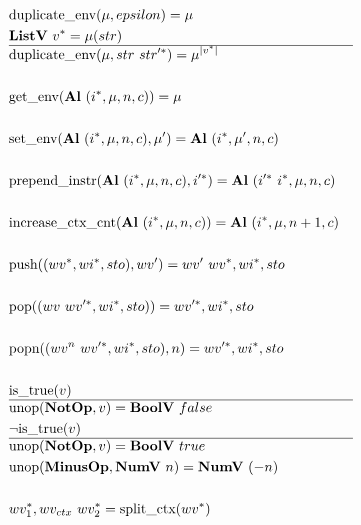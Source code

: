 \begin{align*}
%
\newline \\
  &\duplicateenv(\mu, epsilon) = \mu \\
  &\listv ~ \seq v = \mu(str) \\
  \hline
  &\duplicateenv(\mu, str ~ \seq{str'}) = \mu^{|\seq v|} \\
%
\newline \\
  &\getenv(\al ~ (\seq i, \mu, n, c)) = \mu \\
%
\newline \\
  &\setenv(\al ~ (\seq i, \mu, n, c), \mu') = \al ~ (\seq i, \mu', n, c) \\
%
\newline \\
  &\prependinstr(\al ~ (\seq i, \mu, n, c), \seq{i'}) = \al ~ (\seq{i'} ~ \seq i, \mu, n, c) \\
%
\newline \\
  &\increasectxcnt(\al ~ (\seq i, \mu, n, c)) = \al ~ (\seq i, \mu, n + 1, c) \\
%
\newline \\
  &\push((\seq{wv}, \seq{wi}, sto), wv') = wv' ~ \seq{wv}, \seq{wi}, sto \\
%
\newline \\
  &\pop((wv ~ \seq{wv'}, \seq{wi}, sto)) = \seq{wv'}, \seq{wi}, sto \\
%
\newline \\
  &\popn((wv^n ~ \seq{wv'}, \seq{wi}, sto), n) = \seq{wv'}, \seq{wi}, sto \\
%
\newline \\
  &\istrue(v) \\
  \hline
  &\unop(\notop, v) = \boolv ~ false \\
  &\neg\istrue(v) \\
  \hline
  &\unop(\notop, v) = \boolv ~ true \\
  &\unop(\minusop, \numv ~ n) = \numv ~ (-n) \\
%
\newline \\
  &\seq{wv_1}, wv_{ctx} ~ \seq{wv_2} = \splitctx(\seq{wv}) \\

\end{align*}
